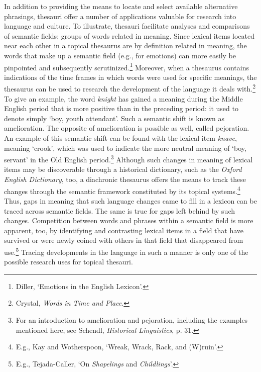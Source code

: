 
In addition to providing the means to locate and select available alternative phrasings, thesauri offer a number of applications valuable for research into language and culture. To illustrate, thesauri facilitate analyses and comparisons of semantic fields: groups of words related in meaning. Since lexical items located near each other in a topical thesaurus are by definition related in meaning, the words that make up a semantic field (e.g., for emotions) can more easily be pinpointed and subsequently scrutinized.\footnote{Diller, `Emotions in the English Lexicon'.} Moreover, when a thesaurus contains indications of the time frames in which words were used for specific meanings, the thesaurus can be used to research the development of the language it deals with.\footnote{Crystal, \textit{Words in Time and Place}.} To give an example, the word \textit{knight} has gained a meaning during the Middle English period that is more positive than in the preceding period: it used to denote simply `boy, youth attendant'. Such a semantic shift is known as amelioration. The opposite of amelioration is possible as well, called pejoration. An example of this semantic shift can be found with the lexical item \textit{knave}, meaning `crook', which was used to indicate the more neutral meaning of `boy, servant' in the Old English period.\footnote{For an introduction to amelioration and pejoration, including the examples mentioned here, see Schendl, \textit{Historical Linguistics}, p. 31.} Although such changes in meaning of lexical items may be discoverable through a historical dictionary, such as the \textit{Oxford English Dictionary}, too, a diachronic thesaurus offers the means to track these changes through the semantic framework constituted by its topical systems.\footnote{E.g., Kay and Wotherspoon, `Wreak, Wrack, Rack, and (W)ruin'.} Thus, gaps in meaning that such language changes came to fill in a lexicon can be traced across semantic fields. The same is true for gaps left behind by such changes. Competition between words and phrases within a semantic field is more apparent, too, by identifying and contrasting lexical items in a field that have survived or were newly coined with others in that field that disappeared from use.\footnote{E.g., Tejada-Caller, `On \textit{Shapelings} and \textit{Childlings}'.} Tracing developments in the language in such a manner is only one of the possible research uses for topical thesauri.


